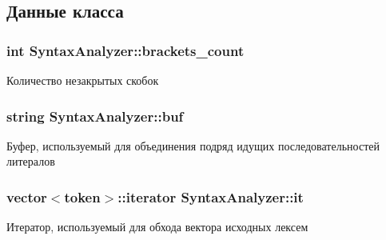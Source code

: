 \subsection{Данные класса}
\subsubsection[{\texorpdfstring{brackets\+\_\+count}{brackets_count}}]{\setlength{\rightskip}{0pt plus 5cm}int Syntax\+Analyzer\+::brackets\+\_\+count\hspace{0.3cm}{\ttfamily [private]}}\hypertarget{class_syntax_analyzer_a9ad8571c7819ba91db174772d3fbfbd9}{}\label{class_syntax_analyzer_a9ad8571c7819ba91db174772d3fbfbd9}


Количество незакрытых скобок 

\subsubsection[{\texorpdfstring{buf}{buf}}]{\setlength{\rightskip}{0pt plus 5cm}string Syntax\+Analyzer\+::buf\hspace{0.3cm}{\ttfamily [private]}}\hypertarget{class_syntax_analyzer_a5b6fe22c4940c5560de49bebe38768e8}{}\label{class_syntax_analyzer_a5b6fe22c4940c5560de49bebe38768e8}


Буфер, используемый для объединения подряд идущих последовательностей литералов 

\subsubsection[{\texorpdfstring{it}{it}}]{\setlength{\rightskip}{0pt plus 5cm}vector$<${\bf token}$>$\+::iterator Syntax\+Analyzer\+::it\hspace{0.3cm}{\ttfamily [private]}}\hypertarget{class_syntax_analyzer_a38e0d3b67ddaa431c1b200f2ad383e61}{}\label{class_syntax_analyzer_a38e0d3b67ddaa431c1b200f2ad383e61}


Итератор, используемый для обхода вектора исходных лексем 

